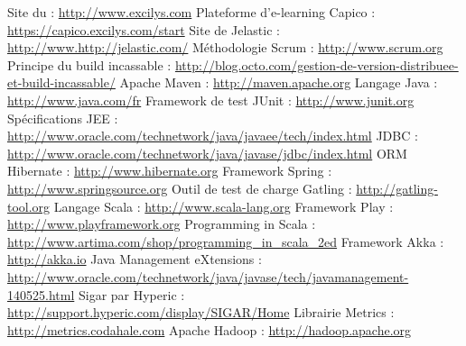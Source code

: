 \begin{thebibliography}{2}
	
	 Site du \excilysGroup{} : \url{http://www.excilys.com}
	 Plateforme d'e-learning Capico : \url{https://capico.excilys.com/start}
	 Site de Jelastic : \url{http://www.http://jelastic.com/}
	 Méthodologie Scrum : \url{http://www.scrum.org}
	 Principe du build incassable : \url{http://blog.octo.com/gestion-de-version-distribuee-et-build-incassable/}
	 Apache Maven : \url{http://maven.apache.org}
	 Langage Java : \url{http://www.java.com/fr}
	 Framework de test JUnit : \url{http://www.junit.org}
	 Spécifications JEE : \url{http://www.oracle.com/technetwork/java/javaee/tech/index.html}
	 JDBC : \url{http://www.oracle.com/technetwork/java/javase/jdbc/index.html}
	 ORM Hibernate : \url{http://www.hibernate.org}
	 Framework Spring : \url{http://www.springsource.org}
	 Outil de test de charge Gatling : \url{http://gatling-tool.org}
	 Langage Scala : \url{http://www.scala-lang.org}
	 Framework Play : \url{http://www.playframework.org}
	 Programming in Scala : \url{http://www.artima.com/shop/programming_in_scala_2ed}
	 Framework Akka : \url{http://akka.io}
	 Java Management eXtensions : \url{http://www.oracle.com/technetwork/java/javase/tech/javamanagement-140525.html}
	 Sigar par Hyperic : \url{http://support.hyperic.com/display/SIGAR/Home}
	 Librairie Metrics : \url{http://metrics.codahale.com}
	 Apache Hadoop : \url{http://hadoop.apache.org}
\end{thebibliography}
